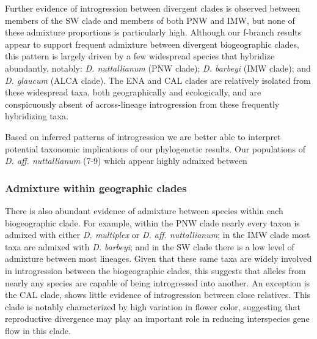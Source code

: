 \documentclass[11pt]{article}
\begin{document}
Further evidence of introgression between divergent clades is observed between
members of the SW clade and members of both PNW and IMW, but none of these 
admixture proportions is particularly high.
% 
Although our f-branch results appear to support frequent admixture between divergent
biogeographic clades, this pattern is largely driven by a few widespread species that
hybridize abundantly, notably: \emph{D. nuttallianum} (PNW clade); 
\emph{D. barbeyi} (IMW clade); 
and \emph{D. glaucum} (ALCA clade). 
% 
The ENA and CAL clades are relatively isolated from these widespread taxa, both 
geographically and ecologically, and are conspicuously absent of across-lineage
introgression from these frequently hybridizing taxa.

Based on inferred patterns of introgression we are better able to interpret 
potential taxonomic implications of our phylogenetic results.
Our populations of \emph{D. aff. nuttallianum} (7-9) which appear highly admixed
between 


\subsubsection{Admixture within geographic clades}

There is also abundant evidence of admixture between species within each 
biogeographic clade.
% 
For example, within the PNW clade nearly every taxon is admixed with either 
\emph{D. multiplex} or \emph{D. aff. nuttallianum}; in the IMW clade most taxa
are admixed with \emph{D. barbeyi}; and in the SW clade there is a low level of
admixture between most lineages.
% 
Given that these same taxa are widely involved in introgression between the
biogeographic clades, this suggests that alleles from nearly any species are
capable of being introgressed into another.
% 
An exception is the CAL clade, shows little evidence of introgression between 
close relatives. 
This clade is notably characterized by high variation in flower color, 
suggesting that reproductive divergence may play an important role in 
reducing interspecies gene flow in this clade.
\end{document}
